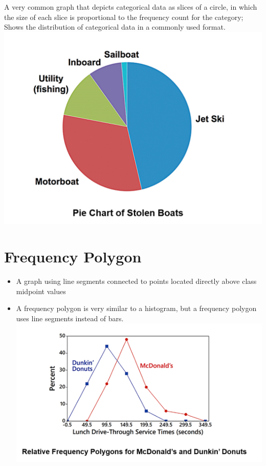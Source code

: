 \documentclass[]{book}
\providecommand{\tightlist}{%
  \setlength{\itemsep}{0pt}\setlength{\parskip}{0pt}}
\begin{document}
A very common graph that depicts categorical data as slices of a circle, in which the size of each slice is proportional to the frequency count for the category; Shows the distribution of categorical data in a commonly used format.
\includegraphics{pie.png}

\hypertarget{frequency-polygon}{%
\section{Frequency Polygon}\label{frequency-polygon}}

\begin{itemize}
\tightlist
\item
  A graph using line segments connected to points located directly above class midpoint values
\item
  A frequency polygon is very similar to a histogram, but a frequency polygon uses line segments instead of bars.
  \includegraphics{polygon.png}
\end{itemize}
\end{document}

